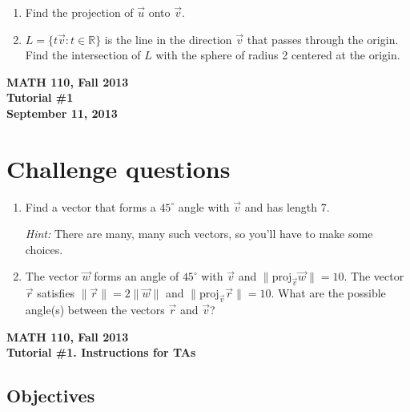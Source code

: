 \documentclass[11pt]{exam}
\newcommand{\R}{\mathbb{R}}
\newcommand{\proj}{\mathrm{proj}}
\newcommand{\mthCourse}{MATH 110}
\newcommand{\mthTerm}{Fall 2013}
\newcommand{\mthTutorialNumber}{1}
\newcommand{\mthDate}{September 11, 2013}
\begin{document}
\begin{enumerate}[resume]
	\item  Find the projection of $\vec u$ onto $\vec v$.

	\item $L=\{t\vec v: t\in \R\}$ is the line in the direction $\vec v$ that
	passes through the origin.  Find the intersection of $L$ with the sphere
	of radius 2 centered at the origin.
\end{enumerate}

\newpage
{
	\begin{center}
		{\bf \mthCourse, \mthTerm}\\ 
		{\bf Tutorial \#\mthTutorialNumber}\\
		{\bf \mthDate}
	\end{center}
}

\section*{Challenge questions}

\begin{enumerate}[resume]

	\item  Find a vector that forms a $45^\circ$ angle with $\vec v$ and has length 7. 

	\emph{Hint:} There are many, many such vectors, so you'll have to make some choices.

	\item The vector $\vec w$ forms an angle of $45^\circ$ with $\vec v$ and
	$\|\proj_{\vec v}\vec w\|=10$.  The vector $\vec r$ satisfies
	$\|\vec r\| = 2\|\vec w\|$ and $\|\proj_{\vec v}\vec r\|=10$.  What are the
	possible angle(s) between the vectors $\vec r$ and $\vec v$?

\end{enumerate}



\newpage
{\small
	\begin{center}
		{\bf \mthCourse, \mthTerm}\\ 
		{\bf Tutorial \#\mthTutorialNumber. Instructions for TAs}
	\end{center}
}

\subsection*{Objectives}
\end{document}

